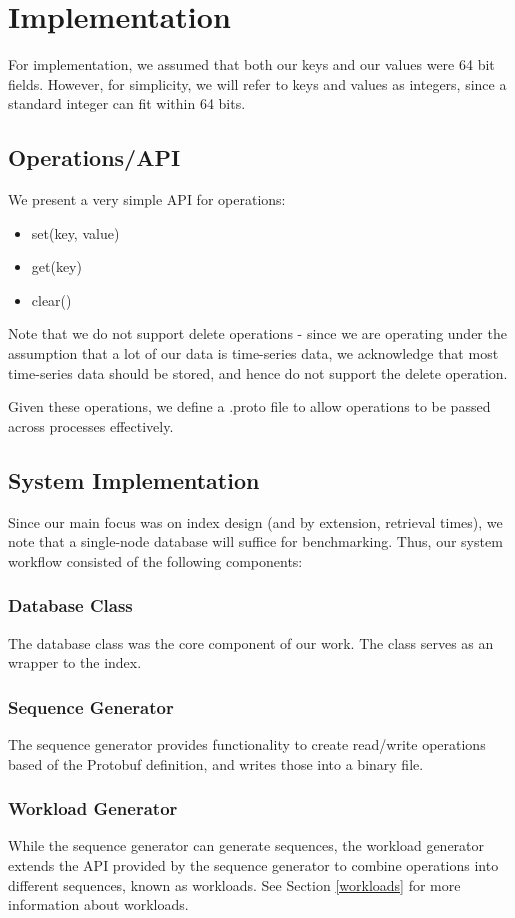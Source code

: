 \documentclass[sigconf]{acmart}
\begin{document}
\section{Implementation}
For implementation, we assumed that both our keys and our values were 64 bit fields. However, for simplicity, we will refer to keys and values as integers, since a standard integer can fit within 64 bits.

\subsection{Operations/API}
We present a very simple API for operations:
\begin{itemize}
  \item set(key, value)
  \item get(key)
  \item clear()
\end{itemize}
Note that we do not support delete operations - since we are operating under the assumption that a lot of our data is time-series data, we acknowledge that most time-series data should be stored, and hence do not support the delete operation.

Given these operations, we define a .proto file to allow operations to be passed across processes effectively.

\subsection{System Implementation}
Since our main focus was on index design (and by extension, retrieval times), we note that a single-node database will suffice for benchmarking. Thus, our system workflow consisted of the following components:

\subsubsection{Database Class}
The database class was the core component of our work. The class serves as an wrapper to the index.

\subsubsection{Sequence Generator} 
The sequence generator provides functionality to create read/write operations based of the Protobuf definition, and writes those into a binary file. 

\subsubsection{Workload Generator}
While the sequence generator can generate sequences, the workload generator extends the API provided by the sequence generator to combine operations into different sequences, known as workloads. See Section \ref{workloads} for more information about workloads.
\end{document}
